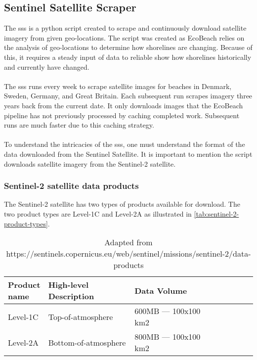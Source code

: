 \subsection{Sentinel Satellite Scraper}\label{subsec:sentinel-satellite-scraper}
The \acrfull{sss} is a python script created to scrape and continuously download satellite imagery from given geo-locations. The script was created as EcoBeach relies on the analysis of geo-locations to determine how shorelines are changing. Because of this, it requires a steady input of data to reliable show how shorelines historically and currently have changed.\\\\
\noindent
The \acrshort{sss} runs every week to scrape satellite images for beaches in Denmark, Sweden, Germany, and Great Britain. Each subsequent run scrapes imagery three years back from the current date. It only downloads images that the EcoBeach pipeline has not previously processed by caching completed work. Subsequent runs are much faster due to this caching strategy. \\\\
\noindent
To understand the intricacies of the \acrshort{sss}, one must understand the format of the data downloaded from the Sentinel Satellite. It is important to mention the script downloads satellite imagery from the Sentinel-2 satellite.

\subsubsection{Sentinel-2 satellite data products}

The Sentinel-2 satellite has two types of products available for download. The two product types are Level-1C and Level-2A as illustrated in \autoref{tab:sentinel-2-product-types}.

\begin{table}[h!]
    \centering
    \begin{tabular}{| p{0.15\linewidth} | p{0.35\linewidth} | p{0.35\linewidth} |p{0.15\linewidth} |}
        \hline
        \textbf{Product name} & \textbf{High-level Description} & \textbf{Data Volume} \\ \hline
        Level-1C              & Top-of-atmosphere               & 600MB — 100x100 km2  \\\hline
        Level-2A              & Bottom-of-atmosphere            & 800MB — 100x100 km2  \\\hline
    \end{tabular}
    \caption{Adapted from https://sentinels.copernicus.eu/web/sentinel/missions/sentinel-2/data-products}
    \label{tab:sentinel-2-product-types}
\end{table}

